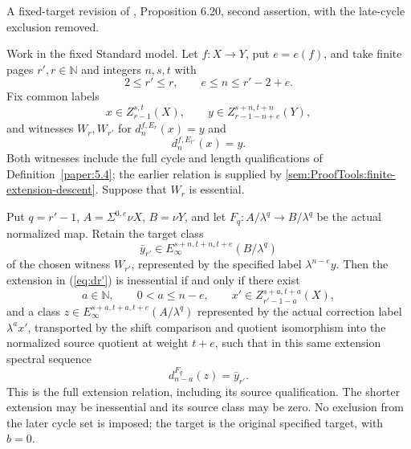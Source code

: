 \begin{proposition}
\label{paper:6.20}
A fixed-target revision of \cite{LWX126}, Proposition 6.20, second assertion, with the late-cycle exclusion removed.\par
\label{prop:dec738d3}
Work in the fixed Standard model. Let $f:X\to Y$, put $e=e(f)$, and take finite pages $r',r\in\mathbb N$ and integers $n,s,t$ with
\[
2\le r'\le r,\qquad e\le n\le r'-2+e.
\]
Fix common labels
\[
x\in Z_{r-1}^{s,t}(X),\qquad y\in Z_{r-1-n+e}^{s+n,t+n}(Y),
\]
and witnesses $W_r,W_{r'}$ for $d_n^{f,E_r}(x)=y$ and
\begin{equation}\label{eq:dr'}
d_n^{f,E_{r'}}(x)=y.
\end{equation}
Both witnesses include the full cycle and length qualifications of Definition~\ref{paper:5.4}; the earlier relation is supplied by \ref{sem:ProofTools:finite-extension-descent}. Suppose that $W_r$ is essential.

Put $q=r'-1$, $A=\Sigma^{0,e}\nu X$, $B=\nu Y$, and let $F_q:A/\lambda^q\to B/\lambda^q$ be the actual normalized map. Retain the target class
\[
\bar y_{r'}\in E_\infty^{s+n,t+n,t+e}(B/\lambda^q)
\]
of the chosen witness $W_{r'}$, represented by the specified label $\lambda^{n-e}y$. Then the extension in (\ref{eq:dr'}) is inessential if and only if there exist
\[
a\in\mathbb N,\qquad 0<a\le n-e,\qquad
x'\in Z_{r'-1-a}^{s+a,t+a}(X),
\]
and a class $z\in E_\infty^{s+a,t+a,t+e}(A/\lambda^q)$ represented by the actual correction label $\lambda^a x'$, transported by the shift comparison and quotient isomorphism into the normalized source quotient at weight $t+e$, such that in this same extension spectral sequence
\[
d_{n-a}^{F_q}(z)=\bar y_{r'}.
\]
This is the full extension relation, including its source qualification. The shorter extension may be inessential and its source class may be zero. No exclusion from the later cycle set is imposed; the target is the original specified target, with $b=0$.


\end{proposition}
